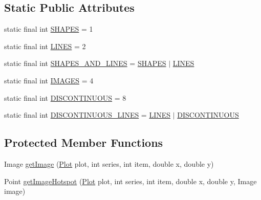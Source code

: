 \subsection*{Static Public Attributes}
\begin{DoxyCompactItemize}
\item 
static final int \mbox{\hyperlink{classorg_1_1jfree_1_1chart_1_1renderer_1_1xy_1_1_standard_x_y_item_renderer_a1a41cb6fbaeb923f922123f5c7d59111}{S\+H\+A\+P\+ES}} = 1
\item 
static final int \mbox{\hyperlink{classorg_1_1jfree_1_1chart_1_1renderer_1_1xy_1_1_standard_x_y_item_renderer_ad1319e29d63456c4781652b08df84d49}{L\+I\+N\+ES}} = 2
\item 
static final int \mbox{\hyperlink{classorg_1_1jfree_1_1chart_1_1renderer_1_1xy_1_1_standard_x_y_item_renderer_a058a54d8d7278e5ee575323faa33ad8a}{S\+H\+A\+P\+E\+S\+\_\+\+A\+N\+D\+\_\+\+L\+I\+N\+ES}} = \mbox{\hyperlink{classorg_1_1jfree_1_1chart_1_1renderer_1_1xy_1_1_standard_x_y_item_renderer_a1a41cb6fbaeb923f922123f5c7d59111}{S\+H\+A\+P\+ES}} $\vert$ \mbox{\hyperlink{classorg_1_1jfree_1_1chart_1_1renderer_1_1xy_1_1_standard_x_y_item_renderer_ad1319e29d63456c4781652b08df84d49}{L\+I\+N\+ES}}
\item 
static final int \mbox{\hyperlink{classorg_1_1jfree_1_1chart_1_1renderer_1_1xy_1_1_standard_x_y_item_renderer_a370ae8ccfee910121c29beb075a39f47}{I\+M\+A\+G\+ES}} = 4
\item 
static final int \mbox{\hyperlink{classorg_1_1jfree_1_1chart_1_1renderer_1_1xy_1_1_standard_x_y_item_renderer_a1e9bd37f44339140bc06b8f641915f38}{D\+I\+S\+C\+O\+N\+T\+I\+N\+U\+O\+US}} = 8
\item 
static final int \mbox{\hyperlink{classorg_1_1jfree_1_1chart_1_1renderer_1_1xy_1_1_standard_x_y_item_renderer_a232bb4443c83399acba69a0028a88dc6}{D\+I\+S\+C\+O\+N\+T\+I\+N\+U\+O\+U\+S\+\_\+\+L\+I\+N\+ES}} = \mbox{\hyperlink{classorg_1_1jfree_1_1chart_1_1renderer_1_1xy_1_1_standard_x_y_item_renderer_ad1319e29d63456c4781652b08df84d49}{L\+I\+N\+ES}} $\vert$ \mbox{\hyperlink{classorg_1_1jfree_1_1chart_1_1renderer_1_1xy_1_1_standard_x_y_item_renderer_a1e9bd37f44339140bc06b8f641915f38}{D\+I\+S\+C\+O\+N\+T\+I\+N\+U\+O\+US}}
\end{DoxyCompactItemize}
\subsection*{Protected Member Functions}
\begin{DoxyCompactItemize}
\item 
Image \mbox{\hyperlink{classorg_1_1jfree_1_1chart_1_1renderer_1_1xy_1_1_standard_x_y_item_renderer_a7f5123b09b36d25b81349ed247b82162}{get\+Image}} (\mbox{\hyperlink{classorg_1_1jfree_1_1chart_1_1plot_1_1_plot}{Plot}} plot, int series, int item, double x, double y)
\item 
Point \mbox{\hyperlink{classorg_1_1jfree_1_1chart_1_1renderer_1_1xy_1_1_standard_x_y_item_renderer_ab5a4bfc68b2280fdca23c3b2e3a91e3f}{get\+Image\+Hotspot}} (\mbox{\hyperlink{classorg_1_1jfree_1_1chart_1_1plot_1_1_plot}{Plot}} plot, int series, int item, double x, double y, Image image)
\end{DoxyCompactItemize}
